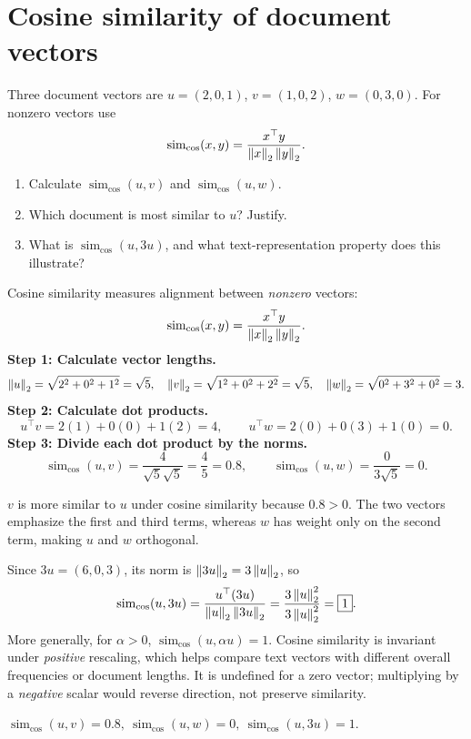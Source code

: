 \section{Cosine similarity of document vectors}
\label{sec:ex12}
\begin{problem}
Three document vectors are $u=(2,0,1)$, $v=(1,0,2)$, $w=(0,3,0)$. For nonzero vectors use
\[\operatorname{sim}_{\cos}(x,y)=\frac{x^\top y}{\left\lVert x\right\rVert_2\left\lVert y\right\rVert_2}.\]
\begin{enumerate}[label=\textbf{(\alph*)}]
\item Calculate $\operatorname{sim}_{\cos}(u,v)$ and $\operatorname{sim}_{\cos}(u,w)$.
\item Which document is most similar to $u$? Justify.
\item What is $\operatorname{sim}_{\cos}(u,3u)$, and what text-representation property does this illustrate?
\end{enumerate}
\end{problem}


Cosine similarity measures alignment between \emph{nonzero} vectors:
\[
\operatorname{sim}_{\cos}(x,y)=\frac{x^\top y}{\left\lVert x\right\rVert_2\left\lVert y\right\rVert_2}.
\]
\textbf{Step 1: Calculate vector lengths.}
\[
\left\lVert u\right\rVert_2=\sqrt{2^2+0^2+1^2}=\sqrt{5},\quad
\left\lVert v\right\rVert_2=\sqrt{1^2+0^2+2^2}=\sqrt{5},\quad
\left\lVert w\right\rVert_2=\sqrt{0^2+3^2+0^2}=3.
\]
\textbf{Step 2: Calculate dot products.}
\[
u^\top v=2(1)+0(0)+1(2)=4,\qquad
u^\top w=2(0)+0(3)+1(0)=0.
\]
\textbf{Step 3: Divide each dot product by the norms.}
\[
\boxed{\operatorname{sim}_{\cos}(u,v)=\frac{4}{\sqrt5\sqrt5}=\frac45=0.8},
\qquad \boxed{\operatorname{sim}_{\cos}(u,w)=\frac{0}{3\sqrt5}=0}.
\]

$\boxed{v}$ is more similar to $u$ under cosine similarity because $0.8>0$. The two vectors emphasize the first and third terms, whereas $w$ has weight only on the second term, making $u$ and $w$ orthogonal.

Since $3u=(6,0,3)$, its norm is $\left\lVert3u\right\rVert_2=3\left\lVert u\right\rVert_2$, so
\[
\operatorname{sim}_{\cos}(u,3u)
=\frac{u^\top(3u)}{\left\lVert u\right\rVert_2\left\lVert3u\right\rVert_2}
=\frac{3\left\lVert u\right\rVert_2^2}{3\left\lVert u\right\rVert_2^2}=\boxed{1}.
\]
More generally, for $\alpha>0$, $\operatorname{sim}_{\cos}(u,\alpha u)=1$. Cosine similarity is invariant under \emph{positive} rescaling, which helps compare text vectors with different overall frequencies or document lengths. It is undefined for a zero vector; multiplying by a \emph{negative} scalar would reverse direction, not preserve similarity.
\begin{answer}
$\boxed{\operatorname{sim}_{\cos}(u,v)=0.8,\ \operatorname{sim}_{\cos}(u,w)=0,\ \operatorname{sim}_{\cos}(u,3u)=1}$.
\end{answer}
